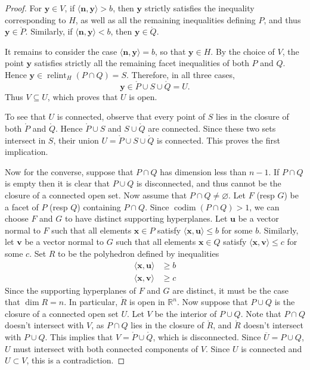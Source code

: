 \documentclass[10pt]{article}
\theoremstyle{definition}
\theoremstyle{remark}
\DeclareMathOperator{\codim}{\mathrm{codim}}
\newcommand{\RR}{{\mathbb{R}}}
\renewcommand{\vec}[1]{\mathbf{#1}}
\def\vn{{\bm{n}}}
\def\vu{{\bm{u}}}
\def\vv{{\bm{v}}}
\def\vx{{\vec{x}}}
\def\vy{{\bm{y}}}
\begin{document}
\begin{proof}
For $\vy \in V$, if $\langle \vn, \vy \rangle > b$, then $\vy$ strictly satisfies the inequality corresponding to $H$, as well as all the remaining inequalities defining $P$, and thus $\vy \in \mathring P$. Similarly, if $\langle \vn, \vy \rangle < b$, then $\vy \in \mathring Q$.

It remains to consider the case $\langle \vn, \vy \rangle = b$, so that $\vy \in H$. By the choice of $V$, the point $\vy$ satisfies strictly
all the remaining facet inequalities of both $P$ and $Q$. Hence $\vy \in \operatorname{relint}_H(P \cap Q) = S$. Therefore, in all three cases,
$$
\vy \in \mathring P \cup S \cup \mathring Q = U.
$$
Thus $V \subseteq U$, which proves that $U$ is open.

To see that $U$ is connected, observe that every point of $S$ lies in the closure of both $\mathring P$ and $\mathring Q$. Hence $\mathring P \cup S$ and $S \cup \mathring Q$ are connected. Since these two sets intersect in $S$, their union $U = \mathring P \cup S \cup \mathring Q$ is connected. This proves the first implication.

    Now for the converse, suppose that $P \cap Q$ has dimension less than $n-1$. If $P \cap Q$ is empty then it is clear that $P \cup Q$ is disconnected, and thus cannot be the closure of a connected open set. Now assume that $P \cap Q \ne \varnothing$.
    Let $F$ (resp $G$) be a facet of $P$ (resp $Q$) containing $P \cap Q$. Since $\codim(P \cap Q) > 1$, we can choose $F$ and $G$ to have distinct supporting hyperplanes. Let $\vu$ be a vector normal to $F$ such that all elements $ \vx \in P$ satisfy $\langle \vx, \vu\rangle \le b$ for some $b$.
    Similarly, let $\vv$ be a vector normal to $G$ such that all elements $\vx \in Q$ satisfy $\langle \vx, \vv\rangle \le c$ for some $c$. Set $R$ to be the polyhedron defined by inequalities
    \begin{align*}
    \langle \vx, \vu\rangle & \ge b \\
     \langle \vx, \vv\rangle & \ge c
    \end{align*}
    Since the supporting hyperplanes of $F$ and $G$ are distinct, it must be the case that $\dim R = n$.
    In particular, $\mathring R$ is open in $\RR^n$. Now suppose that $P \cup Q$ is the closure of a connected open set $U$.
    Let $V$ be the interior of $P \cup Q$. 
    Note that $P \cap Q$ doesn't intersect with $V$, as $P \cap Q$ lies in the closure of $\mathring R$, and $\mathring R$ doesn't intersect with $P \cup Q$. This implies that $V = \mathring P \cup \mathring Q$, which is disconnected. Since $\overline U = P \cup Q$, $U$ must intersect with both connected components of $V$. Since $U$ is connected and $U \subset V$, this is a contradiction. 
\end{proof}
\end{document}
